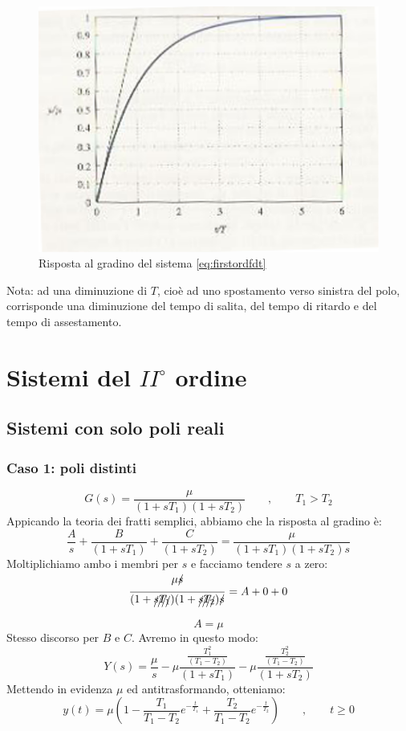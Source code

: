 \documentclass[a4paper]{report}
\begin{document}
\begin{figure}[!h]
\begin{center}
\includegraphics[scale=0.5]{./figures/rispscal1.png}
\caption{Risposta al gradino del sistema \ref{eq:firstordfdt}}\label{fig:risp1}
\end{center}
\end{figure} 
Nota: ad una diminuzione di $T$, cio\`e ad uno spostamento verso
sinistra del polo, corrisponde una diminuzione del tempo di salita,
del tempo di ritardo e del tempo di assestamento.

\section{Sistemi del $II^{\circ}$ ordine}
\subsection{Sistemi con solo poli reali}
\subsubsection{Caso 1: poli distinti}
\begin{equation}\label{eq:secordfdt_c1}
  G(s) = \dfrac{\mu}{(1+sT_1)(1+sT_2)} \qquad, \qquad T_1>T_2
\end{equation}
Appicando la teoria dei fratti semplici, abbiamo che la risposta al
gradino \`e:
\[
  \dfrac{A}{s} + \dfrac{B}{(1 + sT_1)} + \dfrac{C}{(1 + sT_2)} =
  \dfrac{\mu}{(1 + sT_1)(1 + sT_2)s}
\]
Moltiplichiamo ambo i membri per $s$ e facciamo tendere $s$ a zero:
\[
  \dfrac{\mu \xout{s}}{(1 + \xout{sT_1})(1 + \xout{sT_2})\xout{s}} = A
  + 0 + 0
\]
\[
  A = \mu
\]
Stesso discorso per $B$ e $C$. Avremo in questo modo:
\[
  Y(s) = \dfrac{\mu}{s} - \mu \dfrac{\frac{T_1^2}{(T_1 - T_2)}}{(1 + sT_1)} -
  \mu \dfrac{\frac{T_2^2}{(T_1 - T_2)}}{(1 + sT_2)}
\]
Mettendo in evidenza $\mu$ ed antitrasformando, otteniamo:
\begin{equation}\label{eq:rispgradsec_c1}
  y(t) = \mu \left( 1 - \frac{T_1}{T_1-T_2} e^{-\frac{t}{T_1}} +
  \frac{T_2}{T_1-T_2} e^{-\frac{t}{T_2}} \right) \qquad, \qquad t \ge 0
\end{equation}
\end{document}
